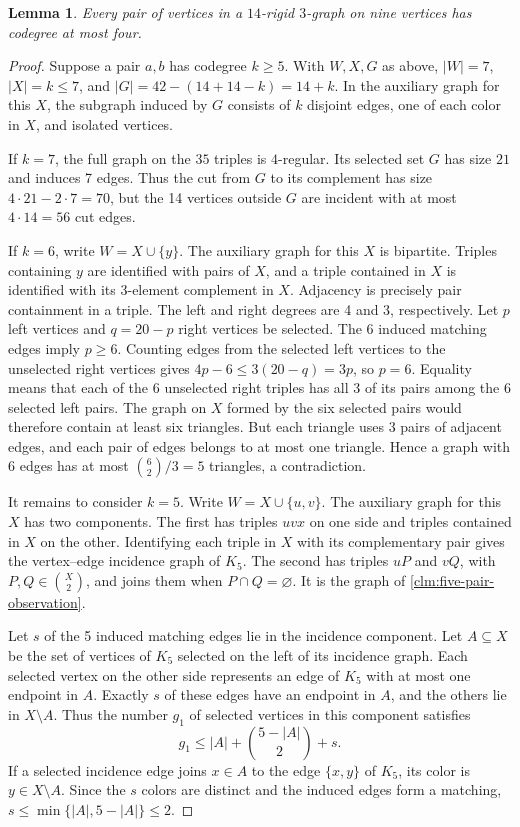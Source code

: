 \documentclass[10pt]{article}
\numberwithin{equation}{section}
\newtheorem{lemma}[lemma]{Lemma}
\theoremstyle{definition}
\begin{document}
\begin{lemma}\label{lem:four-codegree}
Every pair of vertices in a $14$-rigid $3$-graph on nine vertices has codegree at most four.
\end{lemma}
\begin{proof}
Suppose a pair $a,b$ has codegree $k\ge5$. With $W,X,G$ as above, $|W|=7$, $|X|=k\le7$, and $|G|=42-(14+14-k)=14+k$. In the auxiliary graph for this $X$, the subgraph induced by $G$ consists of $k$ disjoint edges, one of each color in $X$, and isolated vertices.

If $k=7$, the full graph on the $35$ triples is $4$-regular. Its selected set $G$ has size $21$ and induces 7 edges. Thus the cut from $G$ to its complement has size $4\cdot21-2\cdot7=70$, but the 14 vertices outside $G$ are incident with at most $4\cdot14=56$ cut edges.

If $k=6$, write $W=X\cup\{y\}$. The auxiliary graph for this $X$ is bipartite. Triples containing $y$ are identified with pairs of $X$, and a triple contained in $X$ is identified with its 3-element complement in $X$. Adjacency is precisely pair containment in a triple. The left and right degrees are 4 and 3, respectively. Let $p$ left vertices and $q=20-p$ right vertices be selected. The 6 induced matching edges imply $p\ge6$. Counting edges from the selected left vertices to the unselected right vertices gives $4p-6\le3(20-q)=3p$, so $p=6$. Equality means that each of the 6 unselected right triples has all 3 of its pairs among the 6 selected left pairs. The graph on $X$ formed by the six selected pairs would therefore contain at least six triangles. But each triangle uses 3 pairs of adjacent edges, and each pair of edges belongs to at most one triangle. Hence a graph with 6 edges has at most $\binom62/3=5$ triangles, a contradiction.

It remains to consider $k=5$. Write $W=X\cup\{u,v\}$. The auxiliary graph for this $X$ has two components. The first has triples $uvx$ on one side and triples contained in $X$ on the other. Identifying each triple in $X$ with its complementary pair gives the vertex--edge incidence graph of $K_5$. The second has triples $uP$ and $vQ$, with $P,Q\in\binom X2$, and joins them when $P\cap Q=\varnothing$. It is the graph of \cref{clm:five-pair-observation}.

Let $s$ of the 5 induced matching edges lie in the incidence component. Let $A\subseteq X$ be the set of vertices of $K_5$ selected on the left of its incidence graph. Each selected vertex on the other side represents an edge of $K_5$ with at most one endpoint in $A$. Exactly $s$ of these edges have an endpoint in $A$, and the others lie in $X\setminus A$. Thus the number $g_1$ of selected vertices in this component satisfies
\[
 g_1\le |A|+\binom{5-|A|}{2}+s.
\]
If a selected incidence edge joins $x\in A$ to the edge $\{x,y\}$ of $K_5$, its color is $y\in X\setminus A$. Since the $s$ colors are distinct and the induced edges form a matching, $s\le\min\{|A|,5-|A|\}\le2$.


\end{proof}
\end{document}
